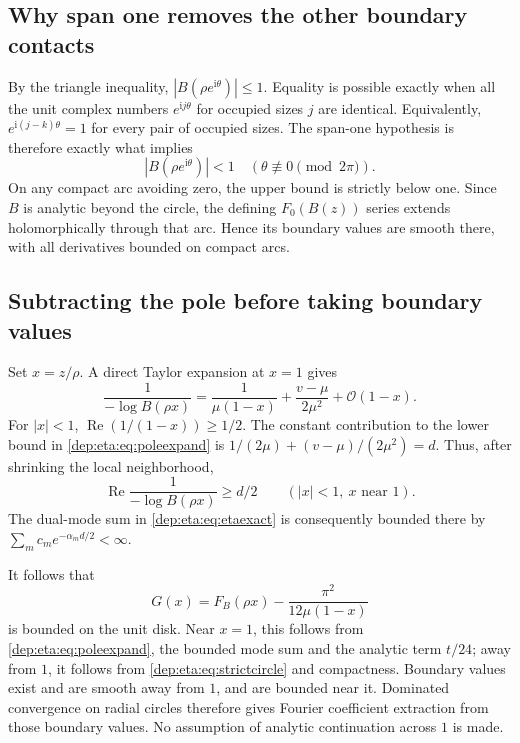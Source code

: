 \documentclass[11pt]{article}
\theoremstyle{definition}\newtheorem{definition}[theorem]{Definition}
\theoremstyle{remark}\newtheorem{remark}[theorem]{Remark}
\newcommand{\OO}{\mathcal O}
\newcommand{\ii}{\mathrm i}
\DeclareMathOperator{\Rea}{Re}
\begin{document}
\subsection{Why span one removes the other boundary contacts}
By the triangle inequality, $|B(\rho e^{\ii\theta})|\le1$.
Equality is possible exactly when all the unit complex numbers
$e^{\ii j\theta}$ for occupied sizes $j$ are identical. Equivalently,
$e^{\ii(j-k)\theta}=1$ for every pair of occupied sizes. The span-one
hypothesis is therefore exactly what implies
\begin{equation}\label{dep:eta:eq:strictcircle}
 |B(\rho e^{\ii\theta})|<1\quad
         (\theta\not\equiv0\pmod{2\pi}).
\end{equation}
On any compact arc avoiding zero, the upper bound is strictly below
one. Since $B$ is analytic beyond the circle, the defining
$F_0(B(z))$ series extends holomorphically through that arc. Hence its
boundary values are smooth there, with all derivatives bounded on
compact arcs.

\subsection{Subtracting the pole before taking boundary values}
Set $x=z/\rho$. A direct Taylor expansion at $x=1$ gives
\begin{equation}\label{dep:eta:eq:poleexpand}
 \frac1{-\log B(\rho x)}
 =\frac1{\mu(1-x)}+\frac{v-\mu}{2\mu^2}+\OO(1-x).
\end{equation}
For $|x|<1$,
$\Rea(1/(1-x))\ge1/2$. The constant contribution to the lower
bound in \eqref{dep:eta:eq:poleexpand} is
$1/(2\mu)+(v-\mu)/(2\mu^2)=d$. Thus, after shrinking the local
neighborhood,
\[
 \Rea\frac1{-\log B(\rho x)}\ge d/2
       \qquad (|x|<1,\ x\text{ near }1).
\]
The dual-mode sum in \eqref{dep:eta:eq:etaexact} is consequently bounded there
by $\sum_m c_m e^{-\alpha_md/2}<\infty$.

It follows that
\begin{equation}\label{dep:eta:eq:G}
 G(x)=F_B(\rho x)-\frac{\pi^2}{12\mu(1-x)}
\end{equation}
is bounded on the unit disk. Near $x=1$, this follows from
\eqref{dep:eta:eq:poleexpand}, the bounded mode sum and the analytic term
$t/24$; away from $1$, it follows from \eqref{dep:eta:eq:strictcircle} and
compactness. Boundary values exist and are smooth away from $1$,
and are bounded near it. Dominated convergence on radial circles
therefore gives Fourier coefficient extraction from those boundary
values. No assumption of analytic continuation across $1$ is made.
\end{document}
